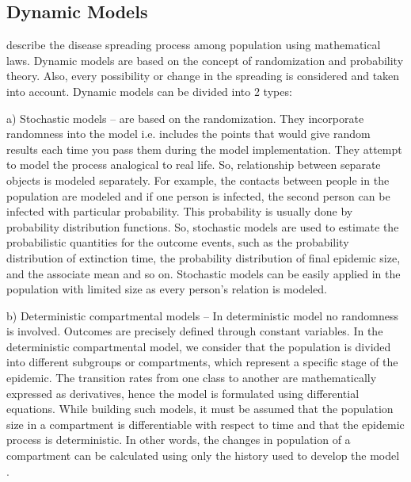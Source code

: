\subsection{Dynamic Models}
describe the disease spreading process among population using mathematical laws. Dynamic models are based on the concept of randomization and probability theory. Also, every possibility or change in the spreading is considered and taken into account. Dynamic models can be divided into 2 types:

a) Stochastic models – are based on the randomization. They incorporate randomness into the model i.e. includes the points that would give random results each time you pass them during the model implementation. They attempt to model the process analogical to real life. So, relationship between separate objects is modeled separately. For example, the contacts between people in the population are modeled and if one person is infected, the second person can be infected with particular probability. This probability is usually done by probability distribution functions. So, stochastic models are used to estimate the probabilistic quantities for the outcome events, such as the probability distribution of extinction time, the probability distribution of final epidemic size, and the associate mean and so on. Stochastic models can be easily applied in the population with limited size as every person’s relation is modeled.

b) Deterministic compartmental models – In deterministic model no randomness is involved. Outcomes are precisely defined through constant variables. In the deterministic compartmental model, we consider that the population is divided into different subgroups or compartments, which represent a specific stage of the epidemic. The transition rates from one class to another are mathematically expressed as derivatives, hence the model is formulated using differential equations. While building such models, it must be assumed that the population size in a compartment is differentiable with respect to time and that the epidemic process is deterministic. In other words, the changes in population of a compartment can be calculated using only the history used to develop the model \cite{per14}.